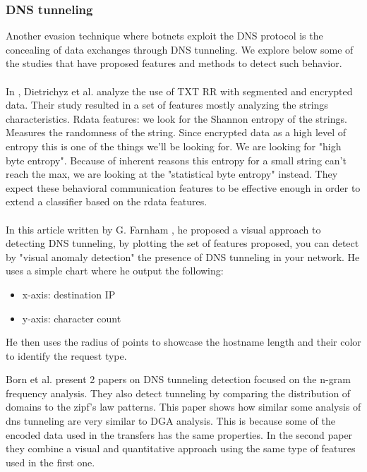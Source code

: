 \subsubsection{DNS tunneling}
Another evasion technique where botnets exploit the DNS protocol is the concealing of data exchanges through DNS tunneling. We explore below some of the studies that have proposed features and methods to detect such behavior.\\
\\
In \cite{tunn}, Dietrichyz et al. analyze the use of TXT RR with segmented and encrypted data. Their study resulted in a set of features mostly analyzing the strings characteristics. Rdata features: we look for the Shannon entropy of the strings. Measures the randomness of the string. Since encrypted data as a high level of entropy this is one of the things we'll be looking for. We are looking for "high byte entropy". Because of inherent reasons this entropy for a small string can't reach the max, we are looking at the "statistical byte entropy" instead. They expect these behavioral communication features to be effective enough in order to extend a classifier based on the rdata features.\\
\\
In this article written by G. Farnham \cite{tunn1}, he proposed a visual approach to detecting DNS tunneling, by plotting the set of features proposed, you can detect by "visual anomaly detection" the presence of DNS tunneling in your network. He uses a simple chart where he output the following: 
\begin{itemize}[noitemsep]
\item x-axis: destination IP
\item y-axis: character count
\end{itemize}
He then uses the radius of points to showcase the hostname length and their color to identify the request type. 



Born et al. \cite{tunn2} \cite{tunn3} present 2 papers on DNS tunneling detection focused on the n-gram frequency analysis. They also detect tunneling by comparing the distribution of domains to the zipf's law patterns. This paper shows how similar some analysis of dns tunneling are very similar to DGA analysis. This is because some of the encoded data used in the transfers has the same properties. In the second paper they combine a visual and quantitative approach using the same type of features used in the first one.

